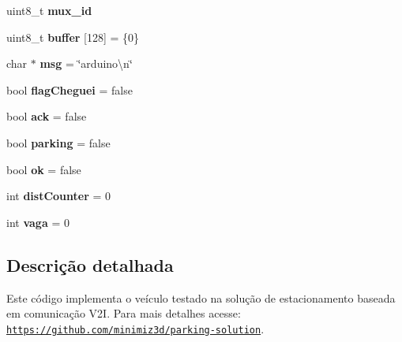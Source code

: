 \begin{DoxyCompactItemize}
\item 
\mbox{\label{parking-solution_8ino_ade5862e7d955b2d0109f6c292405f0b1}} 
uint8\+\_\+t {\bfseries mux\+\_\+id}
\item 
\mbox{\label{parking-solution_8ino_afa8800a1986a982d20f57611c8720de7}} 
uint8\+\_\+t {\bfseries buffer} \mbox{[}128\mbox{]} = \{0\}
\item 
\mbox{\label{parking-solution_8ino_a32d2f5216cddb59c7cc8fb2806a7e727}} 
char $\ast$ {\bfseries msg} = \char`\"{}arduino\textbackslash{}n\char`\"{}
\item 
\mbox{\label{parking-solution_8ino_a3a1338eb3eaa558722a2778f33e7b407}} 
bool {\bfseries flag\+Cheguei} = false
\item 
\mbox{\label{parking-solution_8ino_aee9399e0ee90a2982d7de00ac826f097}} 
bool {\bfseries ack} = false
\item 
\mbox{\label{parking-solution_8ino_ae00f7a5afdb222cb3fb2b6717b86f57f}} 
bool {\bfseries parking} = false
\item 
\mbox{\label{parking-solution_8ino_a1d67bd6634a9002df97231d8c8dbc66c}} 
bool {\bfseries ok} = false
\item 
\mbox{\label{parking-solution_8ino_a376eb4e1c9db5513980312a882b7bbce}} 
int {\bfseries dist\+Counter} = 0
\item 
\mbox{\label{parking-solution_8ino_a793aeddf47ecb66af07b09370794b7db}} 
int {\bfseries vaga} = 0
\end{DoxyCompactItemize}


\subsection{Descrição detalhada}
Este código implementa o veículo testado na solução de estacionamento baseada em comunicação V2I. Para mais detalhes acesse\+: \href{https://github.com/minimiz3d/parking-solution}{\tt https\+://github.\+com/minimiz3d/parking-\/solution}. 

